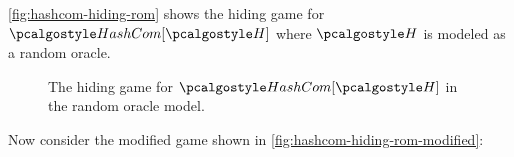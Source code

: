 \ifsolutions
\begin{mysolution}
\autoref{fig:hashcom-hiding-rom} shows the hiding game for $\algo{HashCom}[\algo{H}]$ where $\algo{H}$ is modeled as a random oracle.

\begin{figure}[h]
  \begin{center}
    \begin{tcolorbox}[width=8cm]
      \begin{pchstack}
        \pchspace
      \end{pchstack}
    \end{tcolorbox}
  \end{center}
  \caption{The hiding game for $\algo{HashCom}[\algo{H}]$ in the random oracle model.}
  \label{fig:hashcom-hiding-rom}
\end{figure}

Now consider the modified game shown in \autoref{fig:hashcom-hiding-rom-modified}:


\end{mysolution}
